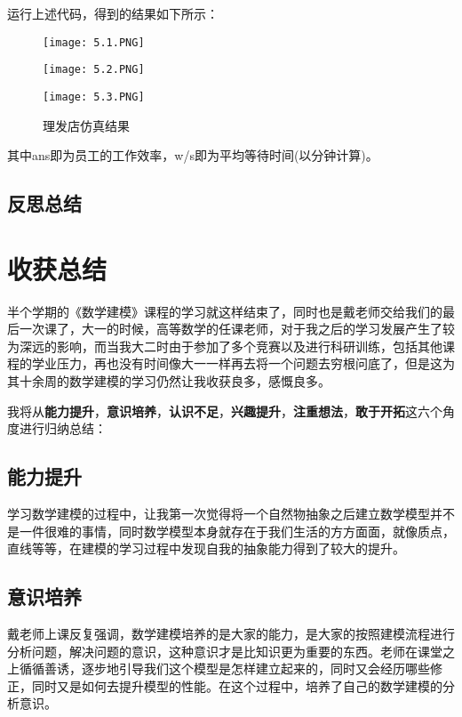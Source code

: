 \documentclass[UTF8]{ctexart}
\begin{document}
   	运行上述代码，得到的结果如下所示：

   	\begin{figure}
	\centering
	\begin{minipage}[c]{0.3\textwidth}
	\centering
	\texttt{[image: 5.1.PNG]}
	\end{minipage}%
	\begin{minipage}[c]{0.3\textwidth}
	\centering
	\texttt{[image: 5.2.PNG]}
	\end{minipage}
	\begin{minipage}[c]{0.3\textwidth}
	\centering
	\texttt{[image: 5.3.PNG]}
	\end{minipage}
	\caption{理发店仿真结果}
	\end{figure}

	其中ans即为员工的工作效率，w/s即为平均等待时间(以分钟计算)。
    
    \subsection{反思总结}

    \section{收获总结}
    半个学期的《数学建模》课程的学习就这样结束了，同时也是戴老师交给我们的最后一次课了，大一的时候，高等数学的任课老师，对于我之后的学习发展产生了较为深远的影响，而当我大二时由于参加了多个竞赛以及进行科研训练，包括其他课程的学业压力，再也没有时间像大一一样再去将一个问题去穷根问底了，但是这为其十余周的数学建模的学习仍然让我收获良多，感慨良多。

   	我将从\textbf{能力提升}，\textbf{意识培养}，\textbf{认识不足}，\textbf{兴趣提升}，\textbf{注重想法}，\textbf{敢于开拓}这六个角度进行归纳总结：

   	\subsection{能力提升}
   	学习数学建模的过程中，让我第一次觉得将一个自然物抽象之后建立数学模型并不是一件很难的事情，同时数学模型本身就存在于我们生活的方方面面，就像质点，直线等等，在建模的学习过程中发现自我的抽象能力得到了较大的提升。

   	\subsection{意识培养}
   	戴老师上课反复强调，数学建模培养的是大家的能力，是大家的按照建模流程进行分析问题，解决问题的意识，这种意识才是比知识更为重要的东西。老师在课堂之上循循善诱，逐步地引导我们这个模型是怎样建立起来的，同时又会经历哪些修正，同时又是如何去提升模型的性能。在这个过程中，培养了自己的数学建模的分析意识。
\end{document}
